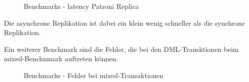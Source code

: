 \begin{flushleft}
\begin{figure}[H]
        \qquad
        \caption{Benchmarks - latency Patroni Replica}
        \label{fig:latency_patroni_replica}
    \end{figure}
    Die asynchrone Replikation ist dabei ein klein wenig schneller als die synchrone Replikation.
\end{flushleft}
\begin{flushleft}
    Ein weiterer Benchmark sind die Fehler, die bei den DML-Transktionen beim mixed-Benchnmark auftreten können.
    \begin{figure}[H]
        \centering
        \qquad
        \caption{Benchmarks - Fehler bei mixed-Transaktionen}
        \label{fig:pgbench_errors}
    \end{figure}
\end{flushleft}
